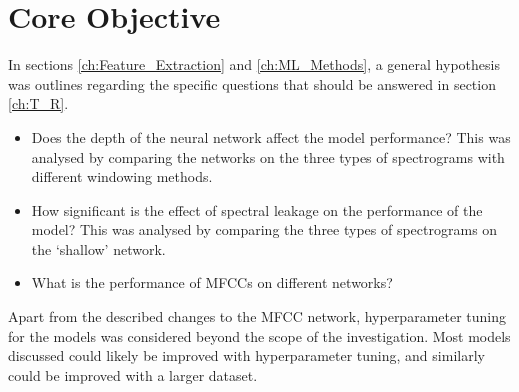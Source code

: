 % 
% 
% 
\section{Core Objective \label{ch:Objective}}
\vspace{0.5cm}

In sections \ref{ch:Feature_Extraction} and \ref{ch:ML_Methods}, a general hypothesis was outlines regarding the specific questions that should be answered in section \ref{ch:T_R}. 

\begin{itemize}
    \item Does the depth of the neural network affect the model performance? This was analysed by comparing the networks on the three types of spectrograms with different windowing methods.
    \item How significant is the effect of spectral leakage on the performance of the model? This was analysed by comparing the three types of spectrograms on the `shallow' network.
    \item What is the performance of MFCCs on different networks? 
\end{itemize}

Apart from the described changes to the MFCC network, hyperparameter tuning for the models was considered beyond the scope of the investigation. Most models discussed could likely be improved with hyperparameter tuning, and similarly could be improved with a larger dataset.

% 
% 
